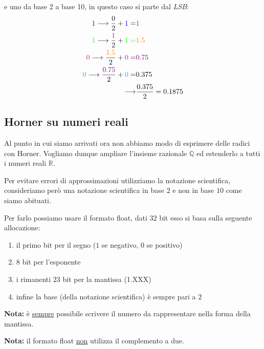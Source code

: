 \documentclass[../main.tex]{subfiles}
\begin{document}
e uno da base 2 a base 10, in questo caso si parte dal \textit{LSB}:
\begin{align*}
    \color{blue}1\color{black} \longrightarrow \frac{0}{2} + \color{blue}1\color{black} =& \color{red}1\\
    \color{green}1\color{black} \longrightarrow \frac{\color{red}1\color{black}}{2} + \color{green}1\color{green} =& \color{orange}1.5\color{black}\\
    \color{magenta}0\color{black} \longrightarrow \frac{\color{orange}1.5\color{black}}{2} + \color{magenta}0\color{black} =& \color{violet}0.75\color{black}\\
    \color{cyan}0\color{black} \longrightarrow \frac{\color{violet}0.75\color{black}}{2} + \color{cyan}0\color{black} =& 0.375\\
    \longrightarrow& \frac{0.375}{2} = 0.1875\\
\end{align*}

\pagebreak
\subsection{Horner su numeri reali}
Al punto in cui siamo arrivati ora non abbiamo modo di esprimere delle radici con Horner. Vogliamo dunque ampliare l'insieme razionale
$\mathbb{Q}$ ed estenderlo a tutti i numeri reali $\mathbb{R}$.

\vspace{0.5cm}
Per evitare errori di approssimazioni utilizziamo la notazione scientifica, consideriamo però una notazione scientifica in 
base $2$ e non in base $10$ come siamo abituati.

Per farlo possiamo usare il formato float, dati $32$ bit esso si basa sulla seguente allocazione:
\begin{enumerate}
    \item il primo bit per il segno ($1$ se negativo, $0$ se positivo)
    \item $8$ bit per l'esponente
    \item i rimanenti $23$ bit per la mantissa (1.XXX)
    \item infine la base (della notazione scientifica) è sempre pari a $2$
\end{enumerate}
\textbf{Nota:} è \underline{sempre} possibile scrivere il numero da rappresentare nella forma della mantissa.

\textbf{Nota:} il formato float \underline{non} utilizza il complemento a due.
\end{document}
